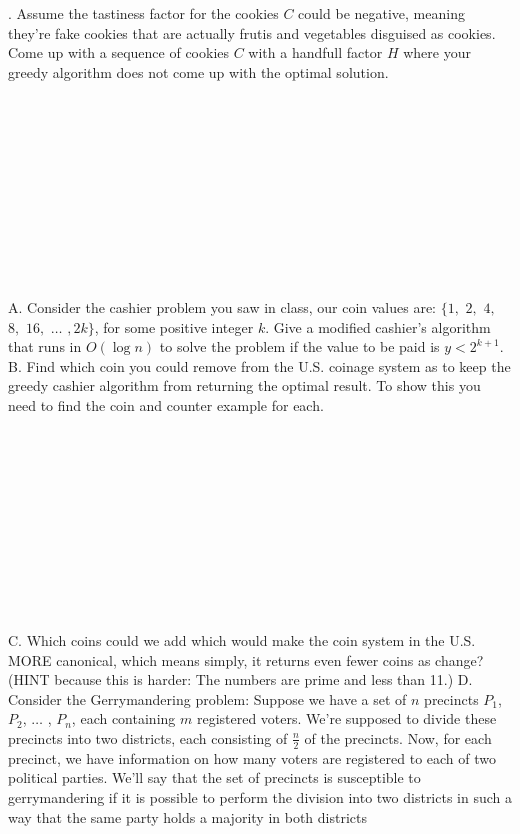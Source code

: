 \documentclass[12pt]{article}
\begin{document}
\newpage {}. Assume the tastiness factor for the cookies $C$ could be negative, meaning they're fake cookies that are actually frutis and vegetables disguised as cookies. Come up with a sequence of cookies $C$ with a handfull factor $H$ where your greedy algorithm does not come up with the optimal solution.\\\\\\\\\\\\\\\\\\\\\\\\
A. Consider the cashier problem you saw in class, our coin values are:
$\{1,$ $2,$ $4,$ $8,$ $16,$ $\dots$ $,2k\}$, for some positive integer $k$. Give a modified cashier's algorithm that runs in $O(\log{n})$
to solve the problem if the value to be paid is $y < 2^{k+1}$.
\newpage
\noindent B. Find which coin you could remove from the U.S. coinage system as to keep the greedy cashier algorithm
from returning the optimal result. To show this you need to find the coin and counter example for each.\\\\\\\\\\\\\\\\\\\\\\\\
C. Which coins could we add which would make the coin system in the U.S. MORE canonical, which means simply, it returns even fewer coins as change? (HINT because this is harder:
The numbers are prime and less than 11.)
\newpage
\noindent D. Consider the Gerrymandering problem: Suppose we have a set of $n$ precincts $P_1$, $P_2$, $\dots$ , $P_n$,
each containing $m$ registered voters. We’re supposed to divide these precincts into two districts,
each consisting of $\frac{n}{2}$ of the precincts. Now, for each precinct, we have information
on how many voters are registered to each of two political parties. We’ll say that the set of
precincts is susceptible to gerrymandering if it is possible to perform the division into two
districts in such a way that the same party holds a majority in both districts
\end{document}
